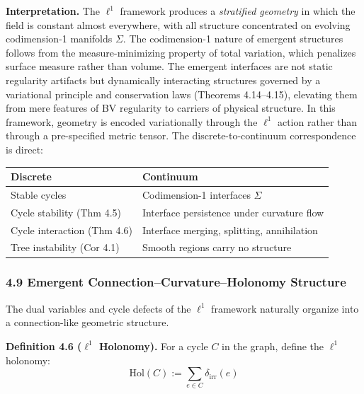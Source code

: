 \documentclass[
]{article}
\begin{document}
\textbf{Interpretation.} The \(\ell^1\) framework produces a
\emph{stratified geometry} in which the field is constant almost
everywhere, with all structure concentrated on evolving codimension-1
manifolds \(\Sigma\). The codimension-1 nature of emergent structures
follows from the measure-minimizing property of total variation, which
penalizes surface measure rather than volume. The emergent interfaces
are not static regularity artifacts but dynamically interacting
structures governed by a variational principle and conservation laws
(Theorems 4.14--4.15), elevating them from mere features of BV
regularity to carriers of physical structure. In this framework,
geometry is encoded variationally through the \(\ell^1\) action rather
than through a pre-specified metric tensor. The discrete-to-continuum
correspondence is direct:

\begin{longtable}[]{@{}
  >{\raggedright\arraybackslash}p{}
  >{\raggedright\arraybackslash}p{}@{}}
\toprule\noalign{}
\begin{minipage}[b]{\linewidth}\raggedright
Discrete
\end{minipage} & \begin{minipage}[b]{\linewidth}\raggedright
Continuum
\end{minipage} \\
\midrule\noalign{}
\endhead
\bottomrule\noalign{}
\endlastfoot
Stable cycles & Codimension-1 interfaces \(\Sigma\) \\
Cycle stability (Thm 4.5) & Interface persistence under curvature
flow \\
Cycle interaction (Thm 4.6) & Interface merging, splitting,
annihilation \\
Tree instability (Cor 4.1) & Smooth regions carry no structure \\
\end{longtable}

\subsubsection{4.9 Emergent Connection--Curvature--Holonomy
Structure}\label{emergent-connectioncurvatureholonomy-structure}

The dual variables and cycle defects of the \(\ell^1\) framework
naturally organize into a connection-like geometric structure.

\textbf{Definition 4.6 (\(\ell^1\) Holonomy).} For a cycle \(C\) in the
graph, define the \(\ell^1\) holonomy:
\[ \mathrm{Hol}(C) := \sum_{e \in C} \delta_{\mathrm{irr}}(e) \]
\end{document}
